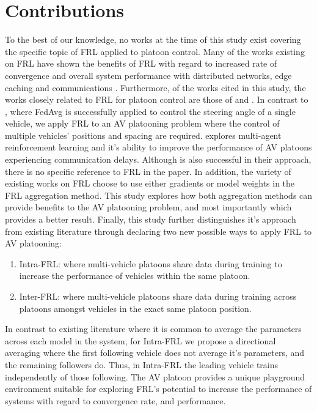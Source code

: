\section{Contributions}
To the best of our knowledge, no works at the time of this study exist covering the
specific topic of FRL applied to platoon control. Many of the works existing on FRL
have shown the benefits of FRL with regard to increased rate of convergence and overall
system performance with distributed networks, edge caching and communications
\cite{ZhangX2020, LimHyun2021, WangXiaofei2021, Huang2021}.  Furthermore, of the works
cited in this study, the works closely related to FRL for platoon control are those of
\cite{Peake2020} and \cite{Liang2019}.  In contrast to \cite{Liang2019}, where FedAvg
is successfully applied to control the steering angle of a single vehicle, we apply
FRL to an AV platooning problem where the control of multiple vehicles' positions and
spacing are required.  \cite{Peake2020} explores multi-agent reinforcement learning
and it's ability to improve the performance of AV platoons experiencing communication delays.
Although \cite{Peake2020} is also successful in their approach, there is no specific
reference to FRL in the paper. In addition, the variety of existing works on FRL
choose to use either gradients or model weights in the FRL aggregation method.
This study explores how both aggregation methods can provide benefits to the AV
platooning problem, and most importantly which provides a better result. Finally, this
study further distinguishes it's approach from existing literature through declaring two
new possible ways to apply FRL to AV platooning:

\begin{enumerate}
    \item Intra-FRL: where multi-vehicle platoons share data during training to increase
    the performance of vehicles within the same platoon.
    \item Inter-FRL: where multi-vehicle platoons share data during training across
    platoons amongst vehicles in the exact same platoon position.
\end{enumerate}

In contrast to existing literature where it is common to average the parameters
across each model in the system, for Intra-FRL we propose a directional averaging where
the first following vehicle does not average it's parameters, and the remaining
followers do. Thus, in Intra-FRL the leading vehicle trains independently of those
following. The AV platoon provides a unique playground environment suitable for
exploring FRL's potential to increase the performance of systems with regard to
convergence rate, and performance.

